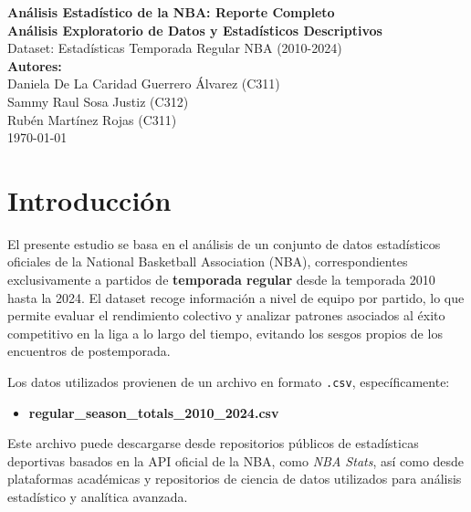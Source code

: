 \documentclass[12pt]{article}
\begin{document}
\begin{titlepage}
    \centering
    \vspace*{1cm}
    \LARGE\textbf{Análisis Estadístico de la NBA: Reporte Completo}\\
    \vspace{0.5cm}
    \large\textbf{Análisis Exploratorio de Datos y Estadísticos Descriptivos}\\
    \vspace{1.5cm}
    \normalsize Dataset: Estadísticas Temporada Regular NBA (2010-2024)\\
    \vspace{2cm}
    \textbf{Autores:}\\
    Daniela De La Caridad Guerrero Álvarez (C311)\\
    Sammy Raul Sosa Justiz (C312)\\
    Rubén Martínez Rojas (C311)\\
    \vfill
    \today
\end{titlepage}

\tableofcontents
\newpage


\section*{Introducción}

El presente estudio se basa en el análisis de un conjunto de datos estadísticos oficiales de la National Basketball Association (NBA), correspondientes exclusivamente a partidos de \textbf{temporada regular} desde la temporada 2010 hasta la 2024. El dataset recoge información a nivel de equipo por partido, lo que permite evaluar el rendimiento colectivo y analizar patrones asociados al éxito competitivo en la liga a lo largo del tiempo, evitando los sesgos propios de los encuentros de postemporada.

Los datos utilizados provienen de un archivo en formato \texttt{.csv}, específicamente:
\begin{itemize}
    \item \textbf{regular\_season\_totals\_2010\_2024.csv}
\end{itemize}

Este archivo puede descargarse desde repositorios públicos de estadísticas deportivas basados en la API oficial de la NBA, como \textit{NBA Stats}, así como desde plataformas académicas y repositorios de ciencia de datos utilizados para análisis estadístico y analítica avanzada.
\end{document}
